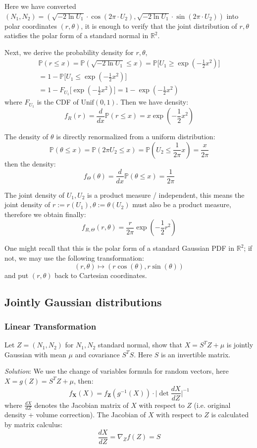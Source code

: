 \documentclass{article}
\begin{document}
Here we have converted $(N_1, N_2) = (\sqrt{-2\ln U_1}\cdot \cos(2\pi \cdot U_2), \sqrt{-2\ln U_1}\cdot \sin(2\pi \cdot U_2))$ into polar coordinates $(r,\theta)$, it is enough to verify that the joint distribution of $r,\theta$ satisfies the polar form of a standard normal in $\mathbb{R}^2$.

Next, we derive the probability density for $r,\theta$, 
\begin{eqnarray*}
\mathbb{P}(r\le x) = \mathbb{P}(\sqrt{-2\ln U_1}\le x) = \mathbb{P}\bigg[U_1\ge \exp(-\frac12x^2)\bigg]\\
    = 1 - \mathbb{P}\bigg[U_1\le \exp(-\frac12x^2)\bigg] \\
    = 1-F_{U_1}\bigg[\exp(-\frac12x^2)\bigg] = 1-\exp(-\frac12x^2)
\end{eqnarray*} where $F_{U_1}$ is the CDF of $\text{Unif}(0,1)$. Then we have density:
$$
    f_{R}(r) = \frac{d}{dx}\mathbb{P}(r\le x) = x\exp(-\frac12x^2)
$$

The density of $\theta$ is directly renormalized from a uniform distribution:
$$
    \mathbb{P}(\theta\le x) = \mathbb{P}({2\pi U_2\le x}) = \mathbb{P}(U_2\le\frac{1}{2\pi}x) = \frac{x}{2\pi}
$$ then the density:
$$
    f_{\Theta}(\theta) = \frac{d}{dx}\mathbb{P}(\theta\le x) = \frac{1}{2\pi}
$$

The joint density of $U_1,U_2$ is a product measure / independent, this means the joint density of $r:=r(U_1), \theta:=\theta(U_2)$ must also be a product measure, therefore we obtain finally:
$$
    f_{R,\Theta}(r,\theta) = \frac{r}{2\pi}\exp(-\frac12r^2)
$$

One might recall that this is the polar form of a standard Gaussian PDF in $\mathbb{R}^2$; if not, we may use the following transformation:
$$
    (r,\theta) \mapsto (r\cos(\theta),r\sin(\theta))
$$ and put $(r,\theta)$ back to Cartesian coordinates.


\subsection{Jointly Gaussian distributions}
\subsubsection{Linear Transformation} Let $Z = (N_1, N_2)$ for $N_1, N_2$ standard normal, show that $X = S^TZ+\mu$ is jointly Gaussian with mean $\mu$ and covariance $S^TS$. Here $S$ is an invertible matrix.

\emph{Solution}: We use the change of variables formula for random vectors, here $X = g(Z) = S^TZ+\mu$, then:
$$
    f_{\mathbf{X}}(X) = f_{\mathbf{Z}}(g^{-1}(X))\cdot\big|\det\frac{dX}{dZ}\big|^{-1}
$$ where $\frac{dX}{dZ}$ denotes the Jacobian matrix of $X$ with respect to $Z$ (i.e. original density + volume correction). The Jacobian of $X$ with respect to $Z$ is calculated by matrix calculus:
$$
    \frac{dX}{dZ} = \nabla_{Z}f(Z) = S
$$
\end{document}
